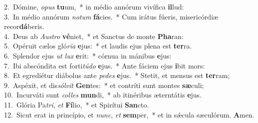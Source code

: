 {2.~}Dómine, \textit{o}\textit{pus} \textbf{tu}um,~* in médio annórum vivífica \textbf{il}lud:\\
{3.~}In médio annórum \textit{no}\textit{tum} \textbf{fá}cies.~* Cum irátus fúeris, misericórdiæ recor\textbf{dá}beris.\\
{4.~}Deus ab \textit{Au}\textit{stro} \textbf{vé}niet,~* et Sanctus de monte \textbf{Pha}ran:\\
{5.~}Opéruit cælos gló\textit{ri}\textit{a} \textbf{e}jus:~* et laudis ejus plena est \textbf{ter}ra.\\
{6.~}Splendor ejus \textit{ut} \textit{lux} \textbf{e}rit:~* córnua in mánibus \textbf{e}jus:\\
{7.~}Ibi abscóndita est forti\textit{tú}\textit{do} \textbf{e}jus.~* Ante fáciem ejus \textbf{i}bit mors:\\
{8.~}Et egrediétur diábolus ante \textit{pe}\textit{des} \textbf{e}jus.~* Stetit, et mensus est \textbf{ter}ram;\\
{9.~}Aspéxit, et dis\textit{sól}\textit{vit} \textbf{Gen}tes:~* et contríti sunt montes \textbf{sæ}culi;\\
{10.~}Incurváti sunt \textit{col}\textit{les} \textbf{mun}di,~* ab itinéribus æterntátis \textbf{e}jus.\\
{11.~}Glória Pa\textit{tri}, \textit{et} \textbf{Fí}lio,~* et Spirítui \textbf{San}cto.\\
{12.~}Sicut erat in princípio, et \textit{nunc}, \textit{et} \textbf{sem}per,~* et in sǽcula sæculórum. \textbf{A}men.\\
